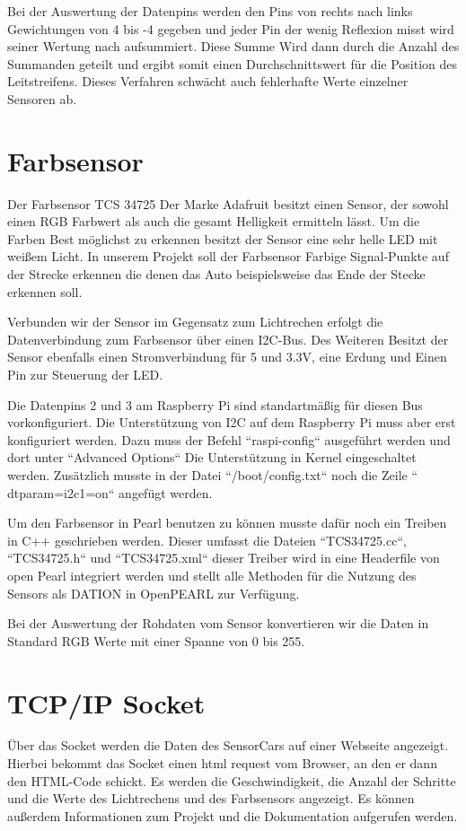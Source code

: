 Bei der Auswertung der Datenpins werden den Pins von rechts nach links Gewichtungen von 4 bis -4 gegeben und jeder Pin der wenig Reflexion misst wird seiner Wertung nach aufsummiert. Diese Summe Wird dann durch die Anzahl des Summanden geteilt und ergibt somit einen Durchschnittswert für die Position des Leitstreifens. Dieses Verfahren schwächt auch fehlerhafte Werte einzelner Sensoren ab.

\section{Farbsensor}
Der Farbsensor TCS 34725 Der Marke Adafruit besitzt einen Sensor, der sowohl einen RGB Farbwert als auch die gesamt Helligkeit ermitteln lässt. Um die Farben Best möglichst zu erkennen besitzt der Sensor eine sehr helle LED mit weißem Licht. In unserem Projekt soll der Farbsensor Farbige Signal-Punkte auf der Strecke erkennen die denen das Auto beispielsweise das Ende der Stecke erkennen soll. 

Verbunden wir der Sensor im Gegensatz zum Lichtrechen erfolgt die Datenverbindung zum Farbsensor über einen I2C-Bus. Des Weiteren Besitzt der Sensor ebenfalls einen Stromverbindung für 5 und 3.3V, eine Erdung und Einen Pin zur Steuerung der LED.

Die Datenpins 2 und 3 am Raspberry Pi sind standartmäßig für diesen Bus vorkonfiguriert. Die Unterstützung von I2C auf dem Raspberry Pi muss aber erst konfiguriert werden. Dazu muss der Befehl “raspi-config“ ausgeführt werden und dort unter “Advanced Options“ Die Unterstützung in Kernel eingeschaltet werden. Zusätzlich musste in der Datei “/boot/config.txt“ noch die Zeile “ dtparam=i2c1=on“ angefügt werden.

Um den Farbsensor in Pearl benutzen zu können musste dafür noch ein Treiben in C++ geschrieben werden. Dieser umfasst die Dateien “TCS34725.cc“, “TCS34725.h“ und “TCS34725.xml“ dieser Treiber wird in eine Headerfile von open Pearl integriert werden und stellt alle Methoden für die Nutzung des Sensors als DATION in OpenPEARL zur Verfügung.

Bei der Auswertung der Rohdaten vom Sensor konvertieren wir die Daten in Standard RGB Werte mit einer Spanne von 0 bis 255.

\section{TCP/IP Socket}
Über das Socket werden die Daten des SensorCars auf einer Webseite angezeigt. Hierbei bekommt das Socket einen html request vom Browser, an den er dann den HTML-Code schickt. Es werden die Geschwindigkeit, die Anzahl der Schritte und die Werte des Lichtrechens und des Farbsensors angezeigt. Es können außerdem Informationen zum Projekt und die Dokumentation aufgerufen werden. 

